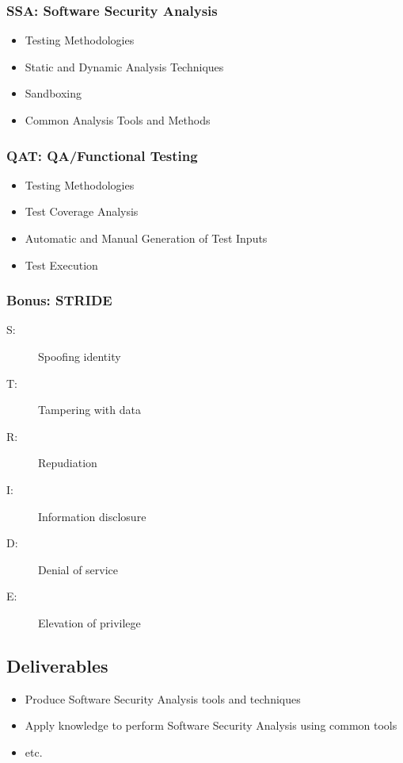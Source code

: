 \documentclass[11pt,a4paper]{article}
\begin{document}
\subsubsection{SSA: Software Security Analysis}
\begin{itemize}
    \item Testing Methodologies
    \item Static and Dynamic Analysis Techniques
    \item Sandboxing
    \item Common Analysis Tools and Methods
\end{itemize}

\subsubsection{QAT: QA/Functional Testing}
\begin{itemize}
    \item Testing Methodologies
    \item Test Coverage Analysis
    \item Automatic and Manual Generation of Test Inputs
    \item Test Execution
\end{itemize}

\subsubsection{Bonus: STRIDE}
\begin{description}
    \item[S:] Spoofing identity
    \item[T:] Tampering with data
    \item[R:] Repudiation
    \item[I:] Information disclosure
    \item[D:] Denial of service
    \item[E:] Elevation of privilege
\end{description}

\subsection{Deliverables}
\begin{itemize}
    \item Produce Software Security Analysis tools and techniques
    \item Apply knowledge to perform Software Security Analysis using common tools
    \item etc.
\end{itemize}
\end{document}
